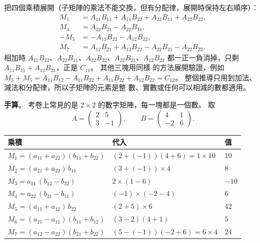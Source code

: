 \begin{whybox}[\texorpdfstring{$C_{11} = M_1 + M_4 - M_5 + M_7$}{C11 = M1 + M4 - M5 + M7} 的驗證]
把四個乘積展開（子矩陣的乘法不能交換，但有分配律，展開時保持左右順序）：
\[
\begin{aligned}
M_1 &= A_{11}B_{11} + A_{11}B_{22} + A_{22}B_{11} + A_{22}B_{22}, \\
M_4 &= A_{22}B_{21} - A_{22}B_{11}, \\
-M_5 &= -A_{11}B_{22} - A_{12}B_{22}, \\
M_7 &= A_{12}B_{21} + A_{12}B_{22} - A_{22}B_{21} - A_{22}B_{22}.
\end{aligned}
\]
相加時 $A_{11}B_{22}$、$A_{22}B_{11}$、$A_{22}B_{22}$、$A_{22}B_{21}$、$A_{12}B_{22}$
都一正一負消掉，只剩 $A_{11}B_{11} + A_{12}B_{21}$，正是 $C_{11}$。 其他三塊用同樣
的方法展開驗證，例如 $M_3 + M_5 = A_{11}B_{12} - A_{11}B_{22} + A_{11}B_{22} +
A_{12}B_{22} = C_{12}$。 整個推導只用到加法、減法和分配律，所以子矩陣的元素是整
數、實數或任何可以相減的數都適用。
\end{whybox}

\textbf{手算}。 考卷上常見的是 $2 \times 2$ 的數字矩陣，每一塊都是一個數。 取
\[
A = \begin{pmatrix} 2 & 5 \\ 3 & -1 \end{pmatrix}, \qquad
B = \begin{pmatrix} 4 & 1 \\ -2 & 6 \end{pmatrix}.
\]

\begin{center}
\begin{tabular}{lll}
\toprule
乘積 & 代入 & 值 \\
\midrule
$M_1 = (a_{11} + a_{22})(b_{11} + b_{22})$ & $(2 + (-1))(4 + 6) = 1 \times 10$ & $10$ \\
$M_2 = (a_{21} + a_{22})\,b_{11}$ & $(3 + (-1)) \times 4$ & $8$ \\
$M_3 = a_{11}\,(b_{12} - b_{22})$ & $2 \times (1 - 6)$ & $-10$ \\
$M_4 = a_{22}\,(b_{21} - b_{11})$ & $(-1) \times (-2 - 4)$ & $6$ \\
$M_5 = (a_{11} + a_{12})\,b_{22}$ & $(2 + 5) \times 6$ & $42$ \\
$M_6 = (a_{21} - a_{11})(b_{11} + b_{12})$ & $(3 - 2)(4 + 1)$ & $5$ \\
$M_7 = (a_{12} - a_{22})(b_{21} + b_{22})$ & $(5 - (-1))(-2 + 6) = 6 \times 4$ & $24$ \\
\bottomrule
\end{tabular}
\end{center}

